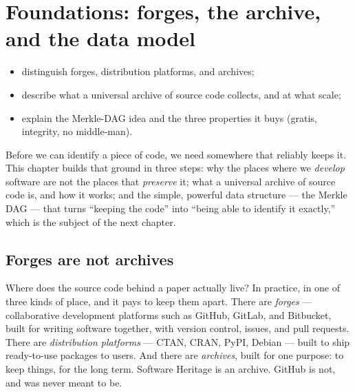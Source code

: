 \chapter{Foundations: forges, the archive, and the data model}
\label{ch:foundations}


\begin{objectives}\small
\begin{itemize}[nosep,leftmargin=*]
  \item distinguish forges, distribution platforms, and archives;
  \item describe what a universal archive of source code collects, and at what scale;
  \item explain the Merkle-DAG idea and the three properties it buys (gratis, integrity,
        no middle-man).
\end{itemize}
\end{objectives}

Before we can identify a piece of code, we need somewhere that reliably keeps it. This chapter
builds that ground in three steps: why the places where we \emph{develop} software are not the
places that \emph{preserve} it; what a universal archive of source code is, and how it works;
and the simple, powerful data structure --- the Merkle DAG --- that turns ``keeping the code''
into ``being able to identify it exactly,'' which is the subject of the next chapter.

\section{Forges are not archives}

Where does the source code behind a paper actually live? In practice, in one of three kinds of
place, and it pays to keep them apart. There are \emph{forges} --- collaborative development
platforms such as GitHub, GitLab, and Bitbucket, built for writing software together, with
version control, issues, and pull requests. There are \emph{distribution platforms} --- CTAN,
CRAN, PyPI, Debian --- built to ship ready-to-use packages to users. And there are
\emph{archives}, built for one purpose: to keep things, for the long term. Software Heritage is
an archive. GitHub is not, and was never meant to be.

